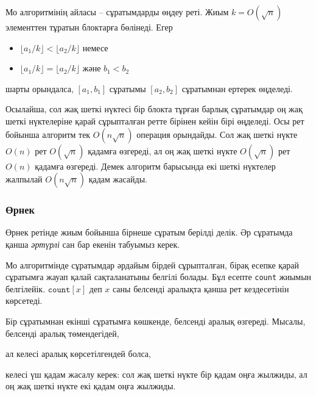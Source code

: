 Мо алгоритмінің айласы -- сұратымдарды өңдеу
реті. Жиым $k=O(\sqrt n)$ элементтен тұратын
блоктарға бөлінеді. Егер
\begin{itemize}
\item $\lfloor a_1/k \rfloor < \lfloor a_2/k \rfloor$ немесе
\item $\lfloor a_1/k \rfloor = \lfloor a_2/k \rfloor$ және $b_1 < b_2$
\end{itemize} шарты орындалса,
$[a_1,b_1]$ сұратымы
$[a_2,b_2]$ сұратымнан ертерек өңделеді.

Осылайша, сол жақ шеткі нүктесі бір блокта тұрған барлық
сұратымдар оң жақ шеткі нүктелеріне қарай сұрыпталған ретте
бірінен кейін бірі өңделеді. Осы рет бойынша алгоритм тек 
$O(n \sqrt n)$ операция орындайды. Сол жақ шеткі нүкте 
$O(n)$ рет $O(\sqrt n)$ қадамға өзгереді, ал оң жақ
шеткі нүкте $O(\sqrt n)$ рет $O(n)$ қадамға өзгереді. 
Демек алгоритм барысында екі шеткі 
нүктелер жалпылай $O(n \sqrt n)$ қадам жасайды. 

\subsubsection*{Өрнек}

Өрнек ретінде жиым бойынша бірнеше сұратым берілді делік.
Әр сұратымда қанша \emph{әртүрлі} сан бар екенін табуымыз керек. 

Мо алгоритмінде сұратымдар әрдайым бірдей сұрыпталған,
бірақ есепке қарай сұратымға жауап қалай сақталанатыны
белгілі болады. Бұл есепте \texttt{count} жиымын белгілейік.
$\texttt{count}[x]$ деп  $x$ саны белсенді аралықта қанша рет
кездесетінін көрсетеді. 

Бір сұратымнан екінші сұратымға көшкенде,
белсенді аралық өзгереді. Мысалы, белсенді
аралық төмендегідей,
\begin{center}
\end{center}
ал келесі аралық көрсетілгендей болса,
\begin{center}
\end{center}
келесі үш қадам жасалу керек:
сол жақ шеткі нүкте бір қадам оңға жылжиды,
ал оң жақ шеткі нүкте екі қадам оңға жылжиды.

